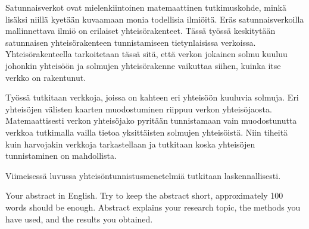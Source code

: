 \documentclass[finnish,12pt,a4paper,pdftex,sci,utf8]{aaltothesis}
\begin{document}
\begin{abstractpage}[finnish]
Satunnaisverkot ovat mielenkiintoinen matemaattinen tutkimuskohde, minkä lisäksi niillä kyetään kuvaamaan monia todellisia ilmiöitä. Eräs satunnaisverkoilla mallinnettava ilmiö on erilaiset yhteisörakenteet. Tässä työssä keskitytään satunnaisen yhteisörakenteen tunnistamiseen tietynlaisissa verkoissa. Yhteisörakenteella tarkoitetaan tässä sitä, että verkon jokainen solmu kuuluu johonkin yhteisöön ja solmujen yhteisörakenne vaikuttaa siihen, kuinka itse verkko on rakentunut.

Työssä tutkitaan verkkoja, joissa on kahteen eri yhteisöön kuuluvia solmuja. Eri yhteisöjen välisten kaarten muodostuminen riippuu verkon yhteisöjaosta. Matemaattisesti verkon yhteisöjako pyritään tunnistamaan vain muodostunutta verkkoa tutkimalla vailla tietoa yksittäisten solmujen yhteisöistä. Niin tiheitä kuin harvojakin verkkoja tarkastellaan ja tutkitaan koska yhteisöjen tunnistaminen on mahdollista.

Viimeisessä luvussa yhteisöntunnistusmenetelmiä tutkitaan laskennallisesti.
\end{abstractpage}

\newpage
%
\begin{abstractpage}[english]
Your abstract in English. Try to keep the abstract short, approximately
 100 words should be enough. Abstract explains your research topic,
 the methods you have used, and the results you obtained.
\end{abstractpage}

\newpage
%
\end{document}

